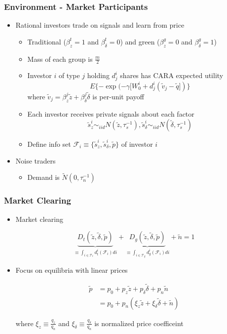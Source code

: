 \documentclass[handout]{beamer}
\begin{document}
\begin{frame}
\frametitle{Environment - Market Participants}
\begin{itemize}[<+->]
\item Rational investors trade on signals and learn from price
\begin{itemize}[<+->]
\item Traditional ($\beta_z^t = 1$ and $\beta_\delta^t = 0$) and green ($\beta_z^g = 0$ and $\beta_\delta^g = 1$)
\item Mass of each group is $\frac{m}{2}$
\item Investor $i$ of type $j$ holding $d_j^i$ shares has CARA expected utility
$$
E\{ - \exp (-\gamma [W_0^i + d_j^i(\tilde v_j - \tilde q])\}
$$
where $\tilde v_j = \beta_z^j \tilde z + \beta_\delta^j \tilde \delta$ is per-unit payoff
\item Each investor receives private signals about each factor
$$
\tilde s^i_z \sim_{iid} N(\tilde z, \tau_s^{-1}), \tilde s^i_\delta \sim_{iid} N(\tilde \delta, \tau_s^{-1})
$$
\item Define info set $\mathcal{F}_i \equiv \{\tilde s^i_z, \tilde s^i_\delta, \tilde p\}$ of investor $i$
\end{itemize}
\bigskip
\item Noise traders
\begin{itemize}[<+->]
\item Demand is $\tilde N(0, \tau_n^{-1})$
\end{itemize}
\end{itemize}
\end{frame}



\begin{frame}
\frametitle{Market Clearing}
\begin{itemize}[<+->]
\item Market clearing

$$
\underbrace{D_t(\tilde z, \tilde \delta, \tilde p)}_{\equiv \int_{i \in \mathcal{T}_t} d_t^i(\mathcal{F}_i)di} + \underbrace{D_g(\tilde z, \tilde \delta, \tilde p)}_{\equiv \int_{i \in \mathcal{T}_g} d_g^i(\mathcal{F}_i) di} + \tilde n = 1
$$

\bigskip

\item Focus on equilibria with linear prices

\begin{align*}
\tilde p 
&= p_0 + p_z \tilde z + p_\delta \tilde \delta + p_n \tilde n \\
&= p_0 + p_n(\xi_z \tilde z + \xi_\delta \tilde \delta + \tilde n) 
\end{align*}

where $\xi_z \equiv \frac{q_z}{q_n}$ and  $\xi_\delta \equiv \frac{q_\delta}{q_n}$ is normalized price coefficeint


\end{itemize}
\end{frame}
\end{document}
